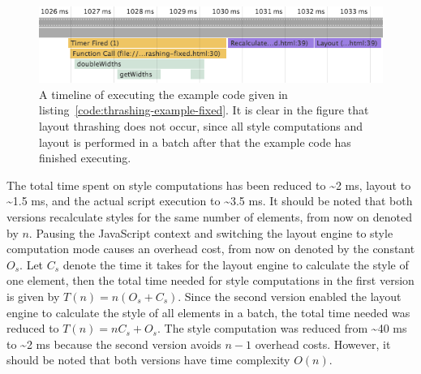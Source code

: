 \documentclass[a4paper,11pt]{kth-mag}
\begin{document}
        \begin{figure}[h]
          \centering
          \includegraphics[scale=0.5]{images/layout-thrashing-example-1-fixed}
          \caption{A timeline of executing the example code given in listing~\ref{code:thrashing-example-fixed}. It is clear in the figure that layout thrashing does not occur, since all style computations and layout is performed in a batch after that the example code has finished executing.}
          \label{fig:layout-thrashing-example-1-fixed}
        \end{figure}

        The total time spent on style computations has been reduced to \textasciitilde2 ms, layout to \textasciitilde1.5 ms, and the actual script execution to \textasciitilde3.5 ms.
        It should be noted that both versions recalculate styles for the same number of elements, from now on denoted by $n$.
        Pausing the JavaScript context and switching the layout engine to style computation mode causes an overhead cost, from now on denoted by the constant $O_{s}$.
        Let $C_{s}$ denote the time it takes for the layout engine to calculate the style of one element, then the total time needed for style computations in the first version is given by $T(n) = n(O_s + C_s)$.
        Since the second version enabled the layout engine to calculate the style of all elements in a batch, the total time needed was reduced to $T(n) = nC_s + O_s$.
        The style computation was reduced from \textasciitilde40 ms to \textasciitilde2 ms because the second version avoids $n - 1$ overhead costs.
        However, it should be noted that both versions have time complexity $O(n)$.
        
\end{document}
